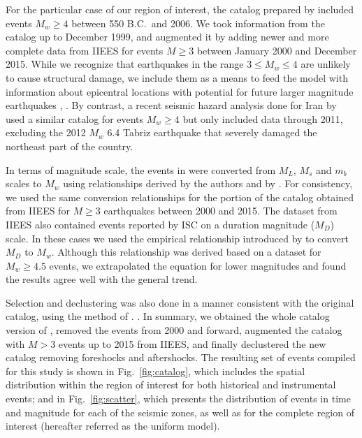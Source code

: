 For the particular case of our region of interest, the catalog prepared by \citet{Zare2014} included events $M_w \geq 4$ between 550 B.C.~and 2006. We took information from the catalog up to December 1999, and augmented it by adding newer and more complete data from IIEES for events $M \geq 3$ between January 2000 and December 2015. While we recognize that earthquakes in the range $3 \leq M_w \leq 4$ are unlikely to cause structural damage, we include them as a means to feed the model with information about epicentral locations with potential for future larger magnitude earthquakes \citep{Kafka_2000_BSSA},  . By contrast, a recent seismic hazard analysis done for Iran by \citet{Khodaverdian_2016_BSSA} used a similar catalog for events $M_w \geq 4$ but only included data through 2011, excluding the 2012 $M_w$ 6.4 Tabriz earthquake that severely damaged the northeast part of the country.

In terms of magnitude scale, the events in \citet{Zare2014} were converted from $M_L$, $M_s$ and $m_b$ scales to $M_w$ using relationships derived by the authors and by \citet{Escordilis_2006_JS}. For consistency, we used the same conversion relationships for the portion of the catalog obtained from IIEES for $M \geq 3$ earthquakes between 2000 and 2015. The dataset from IIEES also contained events reported by ISC on a duration magnitude ($M_D$) scale. In these cases we used the empirical relationship introduced by \citet{Deniz2010} to convert $M_D$ to $M_w$. Although this relationship was derived based on a dataset for $M_w \geq 4.5$ events, we extrapolated the equation for lower magnitudes and found the results agree well with the general trend. 

Selection and declustering was also done in a manner consistent with the original catalog, using the method of \citet{Gardner1974}. . In summary, we obtained the whole catalog version of \citet{Zare2014}, removed the events from 2000 and forward, augmented the catalog with $M>3$ events up to 2015 from IIEES, and finally declustered the new catalog removing foreshocks and aftershocks. The resulting set of events compiled for this study is shown in Fig.~\ref{fig:catalog}, which includes the spatial distribution within the region of interest for both historical and instrumental events; and in Fig.~\ref{fig:scatter}, which presents the distribution of events in time and magnitude for each of the seismic zones, as well as for the complete region of interest (hereafter referred as the uniform model).

